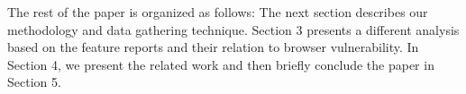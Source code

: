 The rest of the paper is organized as follows: The next section
describes our methodology and data gathering technique. Section 3
presents a different analysis based on the feature reports and their
relation to browser vulnerability. In Section 4, we present the
related work and then briefly conclude the paper in Section 5.